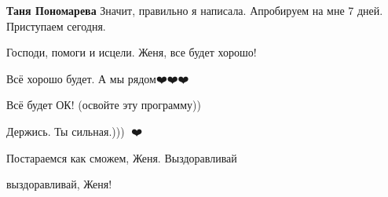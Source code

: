 \begin{itemize}
\textbf{Таня Пономарева} Значит, правильно я написала. Апробируем на мне 7 дней. Приступаем сегодня.


 
Господи, помоги и исцели. Женя, все будет хорошо!

 
Всё хорошо будет. А мы рядом❤️❤️❤️

 
Всё будет ОК!
(освойте эту программу))

 
Держись. Ты сильная.))) 🙏❤️

 
Постараемся как сможем, Женя. Выздоравливай

 
выздоравливай, Женя!

\end{itemize}

